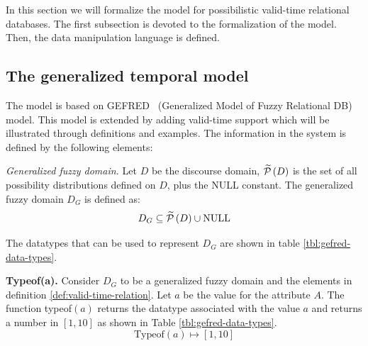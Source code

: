 %
%

In this section we will formalize the model for possibilistic valid-time relational databases. The first subsection is devoted to the formalization of the model. Then, the data manipulation language is defined.

\subsection{\label{subsec:temporal-model}The generalized temporal model}
The model is based on GEFRED~\cite{Medina1994} (Generalized Model of Fuzzy Relational DB) model. This model is extended by adding valid-time support which will be illustrated through definitions and examples. The information in the system is defined by the following elements:

\begin{definition}
\label{def:generalized-fuzzy-domain}
\emph{Generalized fuzzy domain.}
Let $D$ be the discourse domain, $\widetilde {\mathcal{P}}\left(D \right)$ is the set of all possibility distributions defined on $D$, plus the NULL constant. The generalized fuzzy domain $D_G$ is defined as:
\begin{equation}
\label{eq:generalized-fuzzy-domain}
D_G \subseteq \widetilde {\mathcal{P}}\left(D \right)\cup \text{NULL}
\end{equation}
\end{definition}
The datatypes that can be used to represent $D_G$ are shown in table \ref{tbl:gefred-data-types}. 

\begin{definition}
\label{def:typeof-domain}
\textbf{Typeof(a).}
Consider $D_G$ to be a generalized fuzzy domain and the elements in definition \ref{def:valid-time-relation}. Let $a$ be the value for the attribute $A$. The function typeof$\left(a \right)$ returns the datatype associated with the value $a$ and returns a number in $\left[1, 10 \right]$ as shown in Table \ref{tbl:gefred-data-types}.
\begin{equation}
 \label{eq:typeof}
\mbox{Typeof} \left(a \right) \mapsto \left[1, 10 \right]
\end{equation}

\end{definition}


